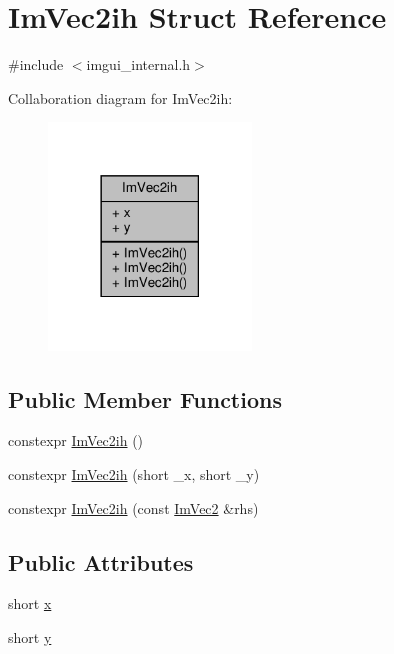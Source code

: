 \hypertarget{structImVec2ih}{}\section{Im\+Vec2ih Struct Reference}
\label{structImVec2ih}


{\ttfamily \#include $<$imgui\+\_\+internal.\+h$>$}



Collaboration diagram for Im\+Vec2ih\+:
\nopagebreak
\begin{figure}[H]
\begin{center}
\leavevmode
\includegraphics[width=153pt]{structImVec2ih__coll__graph}
\end{center}
\end{figure}
\subsection*{Public Member Functions}
\begin{DoxyCompactItemize}
\item 
constexpr \hyperlink{structImVec2ih_ac20cf588ef0083368ec9c9db8dcf3991}{Im\+Vec2ih} ()
\item 
constexpr \hyperlink{structImVec2ih_a949d670852c030a496109290b62fb98b}{Im\+Vec2ih} (short \+\_\+x, short \+\_\+y)
\item 
constexpr \hyperlink{structImVec2ih_a4ff068f147001fc898e28068d1bee03c}{Im\+Vec2ih} (const \hyperlink{structImVec2}{Im\+Vec2} \&rhs)
\end{DoxyCompactItemize}
\subsection*{Public Attributes}
\begin{DoxyCompactItemize}
\item 
short \hyperlink{structImVec2ih_a0963e82728b3ea68d882089e1f5e231b}{x}
\item 
short \hyperlink{structImVec2ih_af8489174701c9070f3874cce8c1e514f}{y}
\end{DoxyCompactItemize}


